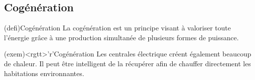 \documentclass[../../main/main.tex]{subfiles}
\begin{document}
\subsection{Cogénération}
\begin{tcbraster}[raster equal height=rows, raster columns=2]
	\begin{tcb}(defi){Cogénération}
		La cogénération est un principe visant à valoriser toute l'énergie grâce à une
		production simultanée de plusieurs formes de puissance.
	\end{tcb}
	\begin{tcb}(exem)<rgtt>'r'{Cogénération}
		Les centrales électrique créent également beaucoup de chaleur. Il peut être
		intelligent de la récupérer afin de chauffer directement les habitations
		environnantes.
	\end{tcb}
\end{tcbraster}
\end{document}
